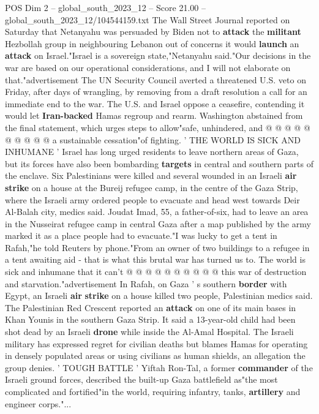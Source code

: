 \begin{textsample}{POS Dim 2 – global\_south\_2023\_12 – Score 21.00 – global\_south\_2023\_12/104544159.txt}
The Wall Street Journal reported on Saturday that Netanyahu was persuaded by Biden not to \textbf{attack} the \textbf{militant} Hezbollah group in neighbouring Lebanon out of concerns it would \textbf{launch} an \textbf{attack} on Israel."Israel is a sovereign state,"Netanyahu said."Our decisions in the war are based on our operational considerations, and I will not elaborate on that."advertisement The UN Security Council averted a threatened U.S. veto on Friday, after days of wrangling, by removing from a draft resolution a call for an immediate end to the war.
The U.S. and Israel oppose a ceasefire, contending it would let \textbf{Iran-backed} Hamas regroup and rearm.
Washington abstained from the final statement, which urges steps to allow"safe, unhindered, and @ @ @ @ @ @ @ @ @ @ a sustainable cessation"of fighting. ' THE WORLD IS SICK AND INHUMANE ' Israel has long urged residents to leave northern areas of Gaza, but its forces have also been bombarding \textbf{targets} in central and southern parts of the enclave.
Six Palestinians were killed and several wounded in an Israeli \textbf{air} \textbf{strike} on a house at the Bureij refugee camp, in the centre of the Gaza Strip, where the Israeli army ordered people to evacuate and head west towards Deir Al-Balah city, medics said.
Joudat Imad, 55, a father-of-six, had to leave an area in the Nusseirat refugee camp in central Gaza after a map published by the army marked it as a place people had to evacuate."I was lucky to get a tent in Rafah,"he told Reuters by phone."From an owner of two buildings to a refugee in a tent awaiting aid - that is what this brutal war has turned us to.
The world is sick and inhumane that it can't @ @ @ @ @ @ @ @ @ @ this war of destruction and starvation."advertisement In Rafah, on Gaza ' s southern \textbf{border} with Egypt, an Israeli \textbf{air} \textbf{strike} on a house killed two people, Palestinian medics said.
The Palestinian Red Crescent reported an \textbf{attack} on one of its main bases in Khan Younis in the southern Gaza Strip.
It said a 13-year-old child had been shot dead by an Israeli \textbf{drone} while inside the Al-Amal Hospital.
The Israeli military has expressed regret for civilian deaths but blames Hamas for operating in densely populated areas or using civilians as human shields, an allegation the group denies. ' TOUGH BATTLE ' Yiftah Ron-Tal, a former \textbf{commander} of the Israeli ground forces, described the built-up Gaza battlefield as"the most complicated and fortified"in the world, requiring infantry, tanks, \textbf{artillery} and engineer corps."...

\end{textsample}
